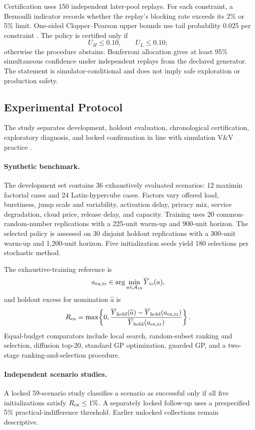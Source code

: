\documentclass[futureinternet,article,submit,moreauthors]{Definitions/mdpi}
\newcommand{\Aset}{\mathcal{A}}
\begin{document}
Certification uses 150 independent later-pool replays. For each constraint, a Bernoulli indicator records whether the replay's blocking rate exceeds its 2\% or 5\% limit. One-sided Clopper--Pearson upper bounds use tail probability 0.025 per constraint \cite{clopper1934}. The policy is certified only if
\[
U_H\leq0.10,\qquad U_L\leq0.10;
\]
otherwise the procedure abstains. Bonferroni allocation gives at least 95\% simultaneous confidence under independent replays from the declared generator. The statement is simulator-conditional and does not imply safe exploration or production safety.

\subsection{Experimental Protocol}
\label{sec:design}

The study separates development, holdout evaluation, chronological certification, exploratory diagnosis, and locked confirmation in line with simulation V\&V practice \cite{sargent2013validation,law2015simulation}.

\paragraph{Synthetic benchmark.}
The development set contains 36 exhaustively evaluated scenarios: 12 maximin factorial cases and 24 Latin-hypercube cases. Factors vary offered load, burstiness, jump scale and variability, activation delay, privacy mix, service degradation, cloud price, release delay, and capacity. Training uses 20 common-random-number replications with a 225-unit warm-up and 900-unit horizon. The selected policy is assessed on 30 disjoint holdout replications with a 300-unit warm-up and 1,200-unit horizon. Five initialization seeds yield 180 selections per stochastic method.

The exhaustive-training reference is
\[
a_{\rm ex,tr}\in\arg\min_{a\in\Aset_{19}}\overline Y_{\rm tr}(a),
\]
and holdout excess for nomination $\widehat a$ is
\[
R_{\rm ex}=\max\!\left\{0,
\frac{\overline Y_{\rm hold}(\widehat a)-
\overline Y_{\rm hold}(a_{\rm ex,tr})}
{\overline Y_{\rm hold}(a_{\rm ex,tr})}\right\}.
\]
Equal-budget comparators include local search, random-subset ranking and selection, diffusion top-20, standard GP optimization, guarded GP, and a two-stage ranking-and-selection procedure.

\paragraph{Independent scenario studies.}
A locked 59-scenario study classifies a scenario as successful only if all five initializations satisfy $R_{\rm ex}\leq1\%$. A separately locked follow-up uses a prespecified 5\% practical-indifference threshold. Earlier unlocked collections remain descriptive.
\end{document}

